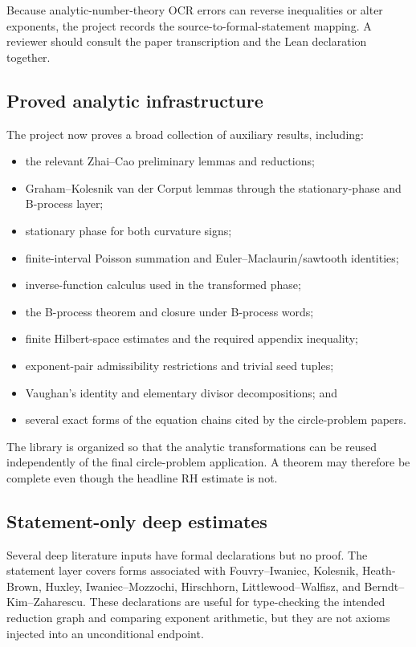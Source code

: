 \documentclass[
  10pt,
  a4paper,
  twoside,
  open=any,
  parskip=half,
  headings=big
]{scrreprt}
\begin{document}
Because analytic-number-theory OCR errors can reverse inequalities or alter exponents, the project records the source-to-formal-statement mapping. A reviewer should consult the paper transcription and the Lean declaration together.

\subsection{Proved analytic infrastructure}

The project now proves a broad collection of auxiliary results, including:

\begin{itemize}
  \item the relevant Zhai--Cao preliminary lemmas and reductions;
  \item Graham--Kolesnik van der Corput lemmas through the stationary-phase and B-process layer;
  \item stationary phase for both curvature signs;
  \item finite-interval Poisson summation and Euler--Maclaurin/sawtooth identities;
  \item inverse-function calculus used in the transformed phase;
  \item the B-process theorem and closure under B-process words;
  \item finite Hilbert-space estimates and the required appendix inequality;
  \item exponent-pair admissibility restrictions and trivial seed tuples;
  \item Vaughan's identity and elementary divisor decompositions; and
  \item several exact forms of the equation chains cited by the circle-problem papers.
\end{itemize}

The library is organized so that the analytic transformations can be reused independently of the final circle-problem application. A theorem may therefore be complete even though the headline RH estimate is not.

\subsection{Statement-only deep estimates}

Several deep literature inputs have formal declarations but no proof. The statement layer covers forms associated with Fouvry--Iwaniec, Kolesnik, Heath-Brown, Huxley, Iwaniec--Mozzochi, Hirschhorn, Littlewood--Walfisz, and Berndt--Kim--Zaharescu. These declarations are useful for type-checking the intended reduction graph and comparing exponent arithmetic, but they are not axioms injected into an unconditional endpoint.
\end{document}
